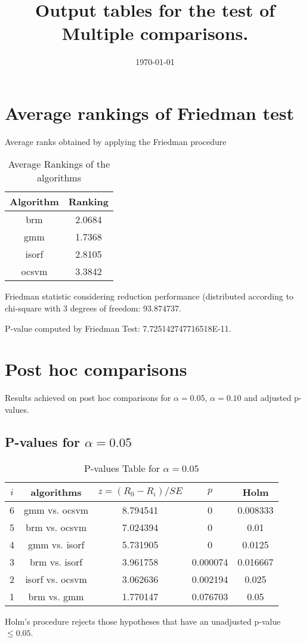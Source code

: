 \documentclass[a4paper,10pt]{article}
\title{Output tables for the test of Multiple comparisons.}
\author{}
\date{\today}
\begin{document}
\begin{landscape}
\pagestyle{empty}
\maketitle
\thispagestyle{empty}
\section{Average rankings of Friedman test}



Average ranks obtained by applying the Friedman procedure

\begin{table}[!htp]
\centering
\begin{tabular}{|c|c|}\hline
Algorithm&Ranking\\\hline
brm & 2.0684\\
gmm & 1.7368\\
isorf & 2.8105\\
ocsvm & 3.3842\\
\hline
\end{tabular}
\caption{Average Rankings of the algorithms}
\end{table}

Friedman statistic considering reduction performance (distributed according to chi-square with 3 degrees of freedom: 93.874737.

P-value computed by Friedman Test: 7.725142747716518E-11.\newline



\pagebreak

\section{Post hoc comparisons}

Results achieved on post hoc comparisons for $\alpha = 0.05$, $\alpha = 0.10$ and adjusted p-values.

\subsection{P-values for $\alpha=0.05$}

\begin{table}[!htp]
\centering\scriptsize
\begin{tabular}{ccccc}
$i$&algorithms&$z=(R_0 - R_i)/SE$&$p$&Holm\\
\hline6&gmm vs. ocsvm&8.794541&0&0.008333\\
5&brm vs. ocsvm&7.024394&0&0.01\\
4&gmm vs. isorf&5.731905&0&0.0125\\
3&brm vs. isorf&3.961758&0.000074&0.016667\\
2&isorf vs. ocsvm&3.062636&0.002194&0.025\\
1&brm vs. gmm&1.770147&0.076703&0.05\\
\hline
\end{tabular}
\caption{P-values Table for $\alpha=0.05$}
\end{table}Holm's procedure rejects those hypotheses that have an unadjusted p-value $\le0.05$.


\end{landscape}
\end{document}
